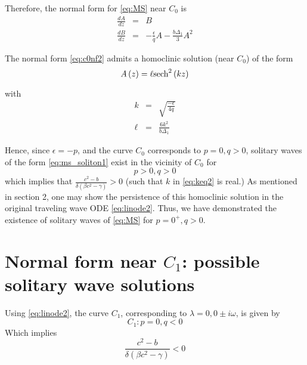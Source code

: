 Therefore, the normal form for \eqref{eq:MS} near $C_0$ is
\begin{subequations}
\begin{eqnarray}
\frac{dA}{dz} &=& B \\
\frac{dB}{dz} &=& -\frac{\epsilon}{q} A - \frac{ b \Delta_1}{3}  A^2
\end{eqnarray}
\end{subequations}

The normal form \eqref{eq:c0nf2} admits a homoclinic solution (near $C_0$) of the form 
\begin{equation} \label{eq:ms_soliton1}
A\left(z\right) = \ell \space \mathrm{sech}^2\left(k z\right)
\end{equation}

with 
\begin{subequations} 
\begin{eqnarray}
k &=& \sqrt{\frac{-\epsilon}{4q}} \label{eq:keq2} \\
\ell &=& \frac{ 6 k^2 }{ b \Delta_1 } 
\end{eqnarray}
\end{subequations}


Hence, since $\epsilon = - p $, and the curve $C_0$ corresponds to $p=0,q>0$, solitary waves of the 
form \eqref{eq:ms_soliton1} exist in the vicinity of $C_0$ for 
\begin{equation}
p > 0, q > 0 
\end{equation}
which implies that $  \frac{c^2 - b}{\delta\left(\beta c^2 - \gamma\right)} > 0 $
(such that $k$ in \eqref{eq:keq2} is real.)  As mentioned in section 2, one may show the persistence
of this homoclinic solution in the original traveling wave ODE \eqref{eq:linode2}. Thus, we have 
demonstrated the existence of solitary waves of \eqref{eq:MS} for $p=0^+, q>0$. 

\section{Normal form near $C_1$: possible solitary wave solutions}
Using \eqref{eq:linode2}, the curve $C_1$, corresponding to $\lambda = 0, 0\pm i \omega$, is given by
\begin{equation}\label{eq:ms_c1}
C_1 : { p = 0, q < 0 }
\end{equation}
Which implies
\begin{equation}
\frac{c^2 - b}{ \delta\left(\beta c^2 - \gamma \right)} < 0
\end{equation}

